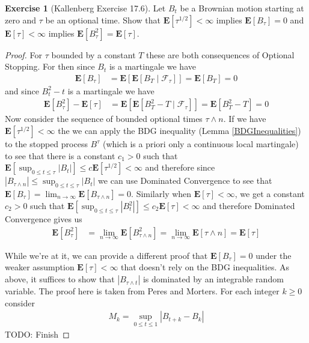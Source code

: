\documentclass{amsbook}
\theoremstyle{definition}
\newtheorem{xca}{Exercise}
\theoremstyle{remark}
\newcommand{\expectation}[1]{\textbf{E}\left[#1\right]}
\newcommand{\cexpectationlong}[2]{\textbf{E}\left[ #2 \mid #1 \right]}
\newcommand{\abs}[1]{\left \vert #1 \right \vert}
\begin{document}
\begin{xca}[Kallenberg Exercise 17.6]Let $B_t$ be a Brownian motion starting at zero and $\tau$ be an optional
  time.  Show that $\expectation{\tau^{1/2}} < \infty$ implies
  $\expectation{B_\tau} = 0$ and $\expectation{\tau} < \infty$ implies
  $\expectation{B^2_\tau} = \expectation{\tau}$.
\end{xca}
\begin{proof}For $\tau$ bounded by a constant $T$ these are both consequences of
  Optional Stopping.  For then since $B_t$ is a martingale we have
\begin{align*}
\expectation{B_\tau} &=
\expectation{\cexpectationlong{\mathcal{F}_\tau}{B_T}} =
\expectation{B_T} = 0
\end{align*}
and since $B^2_t - t$ is a martingale we have
\begin{align*}
\expectation{B^2_\tau} - \expectation{\tau}&=
\expectation{\cexpectationlong{\mathcal{F}_\tau}{B^2_T - T}} =
\expectation{B^2_T - T} = 0
\end{align*}
Now consider the sequence of bounded optional times $\tau \wedge n$.
If we have $\expectation{\tau^{1/2}} < \infty$ the we can apply the
BDG inequality (Lemma \ref{BDGInequalities}) to the stopped process
$B^\tau$ (which is a priori only a continuous local martingale) to see that there is a
constant $c_1 > 0$ such that $\expectation{\sup_{0 \leq t \leq \tau}
  \abs{B_t}} \leq c \expectation{\tau^{1/2}} < \infty$ and therefore
since $\abs{B_{\tau \wedge n}} \leq \sup_{0 \leq t \leq \tau}
\abs{B_t}$ we can use Dominated Convergence to see that
$\expectation{B_\tau} = \lim_{n\to \infty} \expectation{B_{\tau \wedge
    n}} = 0$.  Similarly when $\expectation{\tau} < \infty$, we get a constant $c_2 > 0$ such that $\expectation{\sup_{0 \leq t \leq \tau}
  \abs{B^2_t}} \leq c_2 \expectation{\tau} < \infty$ and therefore
Dominated Convergence gives us 
\begin{align*}
\expectation{B^2_\tau} &= \lim_{n \to \infty} \expectation{B^2_{\tau
    \wedge n}} = \lim_{n \to \infty} \expectation{\tau \wedge n} = \expectation{\tau}
\end{align*}

While we're at it, we can provide a different proof that
$\expectation{B_\tau} = 0$ under the weaker assumption
$\expectation{\tau} < \infty$ that doesn't rely on the BDG
inequalities.  As above, it suffices to show that $\abs{B_{\tau \wedge
    t}}$ is dominated by an integrable random variable.  The proof here is taken from Peres and Morters.  For
each integer $k \geq 0$ consider 
\begin{align*}
M_k = \sup_{0 \leq t \leq 1} \abs{B_{t+k} - B_k}
\end{align*}
TODO: Finish
\end{proof}
\end{document}
